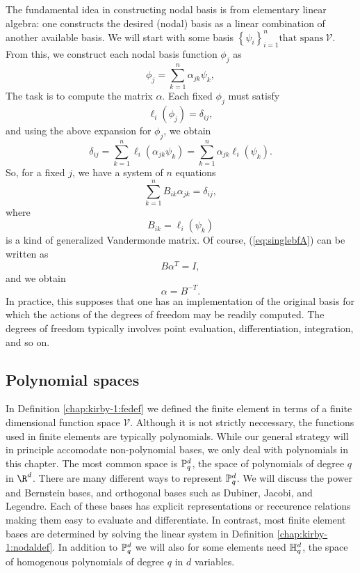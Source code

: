 The fundamental idea in constructing nodal basis is from elementary
linear algebra: one constructs the desired (nodal) basis as a linear
combination of another available basis.  We will start with some
basis \( \left\{ \psi_i \right\}_{i=1}^{n} \mbox{that spans} \  \mathcal{V}  \).  From
this, we construct each nodal basis function $\phi_j$ as
\begin{equation}
 \phi_j = \sum_{k=1}^n \alpha_{jk} \psi_k,
\end{equation}
The task is to compute the matrix \( \alpha \).  Each fixed \( \phi_j \) must
satisfy
\begin{equation}
\ell_i( \phi_j ) = \delta_{ij},
\end{equation}
and using the above expansion for \( \phi_j \), we obtain
\begin{equation}
\delta_{ij} = \sum_{k=1}^n \ell_i( \alpha_{jk} \psi_{k} ) = \sum_{k=1}^n \alpha_{jk} \ell_i (\psi_k).
\end{equation}
So, for a fixed \( j \), we have a system of \( n \) equations
\begin{equation}
\label{eq:singlebfA}
\sum_{k=1}^n B_{ik} \alpha_{jk} = \delta_{ij},
\end{equation}
where
\begin{equation}
B_{ik} = \ell_i(\psi_k)
\end{equation}
is a kind of generalized Vandermonde matrix.   Of course, (\ref{eq:singlebfA}) can be 
written as
\begin{equation}
B \alpha^T = I,
\end{equation}
and we obtain 
\begin{equation}
\alpha = B^{-T}.
\end{equation}
In practice, this supposes that one has an implementation of
the original basis for which the actions of the degrees of freedom  may be readily computed.
The degrees of freedom typically involves point evaluation, differentiation, integration, and so on. 


\subsection{Polynomial spaces}
In Definition \ref{chap:kirby-1:fedef} we defined the finite element in terms
of a finite dimensional function space $\mathcal{V}$. Although it is not strictly
neccessary,
the functions used in finite elements are typically polynomials.
While our general strategy will in principle accomodate non-polynomial bases, we
only deal with polynomials in this chapter.
The most common space is
$\P_q^d$, the space of polynomials of degree $q$ in $\R^d$. There
are many different ways to represent $\P^d_q$. We will discuss the power
and Bernstein bases, and orthogonal bases such as Dubiner, Jacobi, and Legendre.  Each of these bases
has explicit representations or reccurence relations making them easy to 
evaluate and differentiate. In contrast,  
most finite element bases are determined by solving 
the linear system in Definition \ref{chap:kirby-1:nodaldef}.
In addition to $\P^d_q$ we will also for some
elements need $\H^d_q$, the space of homogenous polynomials of degree
\( q \) in \( d \) variables.


